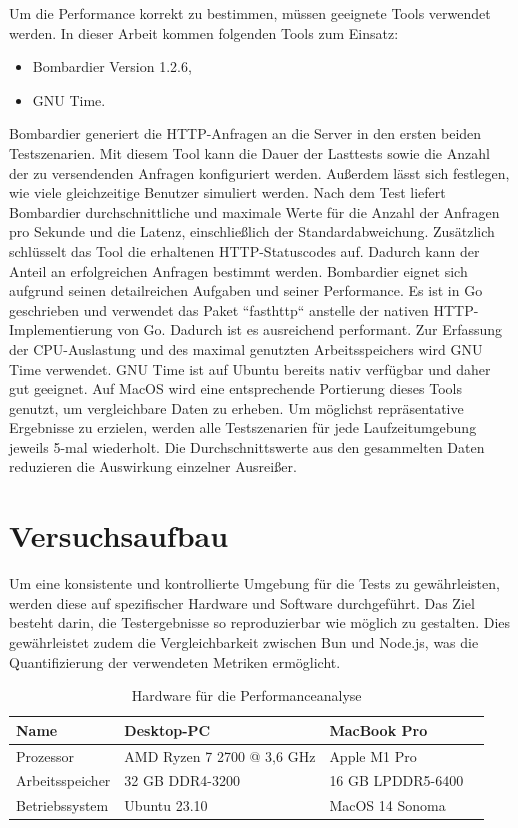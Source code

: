 \noindent
Um die Performance korrekt zu bestimmen, müssen geeignete Tools verwendet werden. In dieser Arbeit kommen folgenden Tools zum Einsatz:

\begin{itemize}
	\item Bombardier Version 1.2.6,
	\item GNU Time.
\end{itemize}

\noindent
Bombardier generiert die HTTP-Anfragen an die Server in den ersten beiden Testszenarien. Mit diesem Tool kann die Dauer der Lasttests sowie die Anzahl der zu versendenden Anfragen konfiguriert werden. Außerdem lässt sich festlegen, wie viele gleichzeitige Benutzer simuliert werden. Nach dem Test liefert Bombardier durchschnittliche und maximale Werte für die Anzahl der Anfragen pro Sekunde und die Latenz, einschließlich der Standardabweichung. Zusätzlich schlüsselt das Tool die erhaltenen HTTP-Statuscodes auf. Dadurch kann der Anteil an erfolgreichen Anfragen bestimmt werden. Bombardier eignet sich aufgrund seinen detailreichen Aufgaben und seiner Performance. Es ist in Go geschrieben und verwendet das Paket ``fasthttp`` anstelle der nativen HTTP-Implementierung von Go. Dadurch ist es ausreichend performant. Zur Erfassung der CPU-Auslastung und des maximal genutzten Arbeitsspeichers wird GNU Time verwendet. GNU Time ist auf Ubuntu bereits nativ verfügbar und daher gut geeignet. Auf MacOS wird eine entsprechende Portierung dieses Tools genutzt, um vergleichbare Daten zu erheben. \newline
Um möglichst repräsentative Ergebnisse zu erzielen, werden alle Testszenarien für jede Laufzeitumgebung jeweils 5-mal wiederholt. Die Durchschnittswerte aus den gesammelten Daten reduzieren die Auswirkung einzelner Ausreißer.


\section{Versuchsaufbau} \label{sec:performance-testSetup}
Um eine konsistente und kontrollierte Umgebung für die Tests zu gewährleisten, werden diese auf spezifischer Hardware und Software durchgeführt. Das Ziel besteht darin, die Testergebnisse so reproduzierbar wie möglich zu gestalten. Dies gewährleistet zudem die Vergleichbarkeit zwischen Bun und Node.js, was die Quantifizierung der verwendeten Metriken ermöglicht.

\begin{table}[h]
	\centering
	\begin{tabular}{|p{3cm}|p{3cm}|p{3cm}|p{3cm}|}
		\hline
		Name & Desktop-PC & MacBook Pro \\
		\hline
		Prozessor & AMD Ryzen 7 2700 @ 3,6 GHz & Apple M1 Pro \\
		\hline
		Arbeitsspeicher & 32 GB DDR4-3200 & 16 GB LPDDR5-6400 \\
		\hline
		Betriebssystem & Ubuntu 23.10 & MacOS 14 Sonoma \\
		\hline
	\end{tabular}
	\caption{Hardware für die Performanceanalyse}
	\label{table:hardware}
\end{table}

